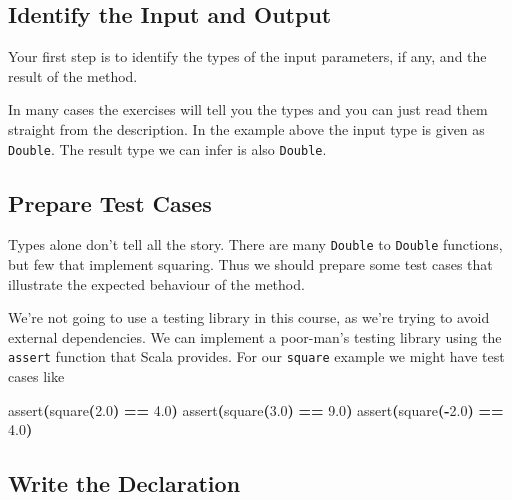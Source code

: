 \documentclass[11pt,a5paper,]{book}
\newenvironment{Shaded}{\begin{snugshade}}{\end{snugshade}}
\newcommand{\FloatTok}[1]{\textcolor[rgb]{0.00,0.00,0.81}{#1}}
\newcommand{\FunctionTok}[1]{\textcolor[rgb]{0.00,0.00,0.00}{#1}}
\newcommand{\OperatorTok}[1]{\textcolor[rgb]{0.81,0.36,0.00}{\textbf{#1}}}
\begin{document}
\hypertarget{identify-the-input-and-output}{%
\subsection{Identify the Input and
Output}\label{identify-the-input-and-output}}

Your first step is to identify the types of the input parameters, if
any, and the result of the method.

In many cases the exercises will tell you the types and you can just
read them straight from the description. In the example above the input
type is given as \texttt{Double}. The result type we can infer is also
\texttt{Double}.

\hypertarget{prepare-test-cases}{%
\subsection{Prepare Test Cases}\label{prepare-test-cases}}

Types alone don't tell all the story. There are many \texttt{Double} to
\texttt{Double} functions, but few that implement squaring. Thus we
should prepare some test cases that illustrate the expected behaviour of
the method.

We're not going to use a testing library in this course, as we're trying
to avoid external dependencies. We can implement a poor-man's testing
library using the \texttt{assert} function that Scala provides. For our
\texttt{square} example we might have test cases like

\begin{Shaded}
\begin{Highlighting}[]
\FunctionTok{assert}\OperatorTok{(}\FunctionTok{square}\OperatorTok{(}\FloatTok{2.0}\OperatorTok{)} \OperatorTok{==} \FloatTok{4.0}\OperatorTok{)}
\FunctionTok{assert}\OperatorTok{(}\FunctionTok{square}\OperatorTok{(}\FloatTok{3.0}\OperatorTok{)} \OperatorTok{==} \FloatTok{9.0}\OperatorTok{)}
\FunctionTok{assert}\OperatorTok{(}\FunctionTok{square}\OperatorTok{({-}}\FloatTok{2.0}\OperatorTok{)} \OperatorTok{==} \FloatTok{4.0}\OperatorTok{)}
\end{Highlighting}
\end{Shaded}

\hypertarget{write-the-declaration}{%
\subsection{Write the Declaration}\label{write-the-declaration}}
\end{document}
